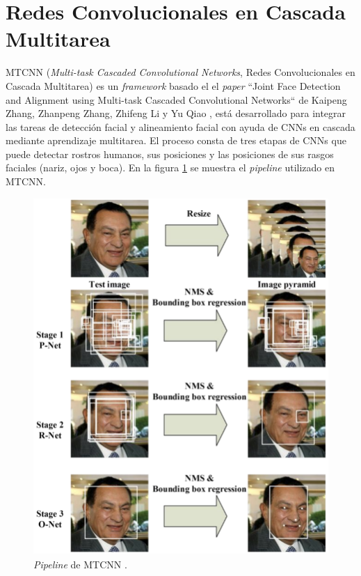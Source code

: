 \section{Redes Convolucionales en Cascada Multitarea}
MTCNN (\textit{Multi-task Cascaded Convolutional Networks}, Redes Convolucionales en Cascada Multitarea) es un \textit{framework} basado el el \textit{paper} ``Joint Face Detection and Alignment using Multi-task Cascaded Convolutional Networks`` de Kaipeng Zhang, Zhanpeng Zhang, Zhifeng Li y Yu Qiao \cite{mtcnn_info}, está desarrollado para integrar las tareas de detección facial y alineamiento facial con ayuda de CNNs en cascada mediante aprendizaje multitarea. El proceso consta de tres etapas de CNNs que puede detectar rostros humanos, sus posiciones y las posiciones de sus rasgos faciales (nariz, ojos y boca). En la figura \ref{fig:mtcnn_pipe} se muestra el \textit{pipeline} utilizado en MTCNN.

\begin{figure}[h]
	\centering
	\includegraphics[scale=0.5]{./Figures/mtcnn_pipe.png}
	\caption{\textit{Pipeline} de MTCNN \cite{mtcnn_info}.}
	\label{fig:mtcnn_pipe}
\end{figure}

